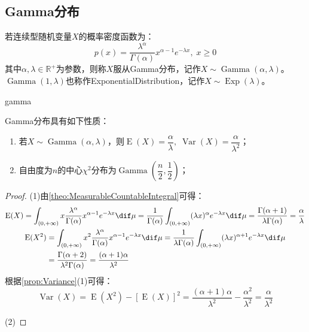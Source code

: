 \subsection{Gamma分布}
\begin{definition}
	若连续型随机变量$X$的概率密度函数为：
	\begin{equation*}
		p(x)=\frac{\lambda^\alpha}{\Gamma(\alpha)}x^{\alpha-1}e^{-\lambda x},\;x\geqslant0
	\end{equation*}
	其中$\alpha,\lambda\in\mathbb{R}^{+}$为参数，则称$X$服从Gamma分布，记作$X\sim\operatorname{Gamma}(\alpha,\lambda)$。$\operatorname{Gamma}(1,\lambda)$也称作\gls{ExponentialDistribution}，记作$X\sim\operatorname{Exp}(\lambda)$。
\end{definition}
\begin{densityplot}{gamma}
	\caption{Gamma分布 $\operatorname{Gamma}(3,1)$ 的概率密度函数，其中 $\lambda$ 为率参数}
\end{densityplot}
\begin{property}
	Gamma分布具有如下性质：
	\begin{enumerate}
		\item 若$X\sim\operatorname{Gamma}(\alpha,\lambda)$，则$\operatorname{E}(X)=\dfrac{\alpha}{\lambda},\;\operatorname{Var}(X)=\dfrac{\alpha}{\lambda^2}$；
		\item 自由度为$n$的中心$\chi^2$分布为$\operatorname{Gamma}\left(\dfrac{n}{2},\dfrac{1}{2}\right)$；
	\end{enumerate}
\end{property}
\begin{proof}
	(1)由\cref{theo:MeasurableCountableIntegral}可得：
	\begin{gather*}
		\operatorname{E}(X)=\int_{(0,+\infty)}x\frac{\lambda^\alpha}{\Gamma(\alpha)}x^{\alpha-1}e^{-\lambda x}\dif\mu=\frac{1}{\Gamma(\alpha)}\int_{(0,+\infty)}(\lambda x)^{\alpha}e^{-\lambda x}\dif\mu=\frac{\Gamma(\alpha+1)}{\lambda\Gamma(\alpha)}=\frac{\alpha}{\lambda} \\
		\begin{aligned}
			\operatorname{E}(X^2)&=\int_{(0,+\infty)}x^2\frac{\lambda^\alpha}{\Gamma(\alpha)}x^{\alpha-1}e^{-\lambda x}\dif\mu=\frac{1}{\lambda\Gamma(\alpha)}\int_{(0,+\infty)}(\lambda x)^{\alpha+1}e^{-\lambda x}\dif\mu \\
			&=\frac{\Gamma(\alpha+2)}{\lambda^2\Gamma(\alpha)}=\frac{(\alpha+1)\alpha}{\lambda^2}
		\end{aligned}
	\end{gather*}
	根据\cref{prop:Variance}(1)可得：
	\begin{equation*}
		\operatorname{Var}(X)=\operatorname{E}(X^2)-[\operatorname{E}(X)]^2=\frac{(\alpha+1)\alpha}{\lambda^2}-\frac{\alpha^2}{\lambda^2}=\frac{\alpha}{\lambda^2}
	\end{equation*}\par
	(2)
\end{proof}

